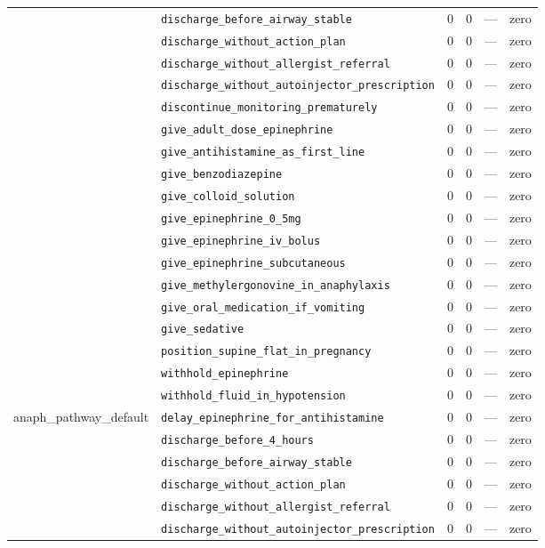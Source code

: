 \begin{table}[ht]
\begin{tabular}{llrrrl}
 & \texttt{discharge\_before\_airway\_stable} & 0 & 0 & — & zero \\
 & \texttt{discharge\_without\_action\_plan} & 0 & 0 & — & zero \\
 & \texttt{discharge\_without\_allergist\_referral} & 0 & 0 & — & zero \\
 & \texttt{discharge\_without\_autoinjector\_prescription} & 0 & 0 & — & zero \\
 & \texttt{discontinue\_monitoring\_prematurely} & 0 & 0 & — & zero \\
 & \texttt{give\_adult\_dose\_epinephrine} & 0 & 0 & — & zero \\
 & \texttt{give\_antihistamine\_as\_first\_line} & 0 & 0 & — & zero \\
 & \texttt{give\_benzodiazepine} & 0 & 0 & — & zero \\
 & \texttt{give\_colloid\_solution} & 0 & 0 & — & zero \\
 & \texttt{give\_epinephrine\_0\_5mg} & 0 & 0 & — & zero \\
 & \texttt{give\_epinephrine\_iv\_bolus} & 0 & 0 & — & zero \\
 & \texttt{give\_epinephrine\_subcutaneous} & 0 & 0 & — & zero \\
 & \texttt{give\_methylergonovine\_in\_anaphylaxis} & 0 & 0 & — & zero \\
 & \texttt{give\_oral\_medication\_if\_vomiting} & 0 & 0 & — & zero \\
 & \texttt{give\_sedative} & 0 & 0 & — & zero \\
 & \texttt{position\_supine\_flat\_in\_pregnancy} & 0 & 0 & — & zero \\
 & \texttt{withhold\_epinephrine} & 0 & 0 & — & zero \\
 & \texttt{withhold\_fluid\_in\_hypotension} & 0 & 0 & — & zero \\
\midrule
anaph\_pathway\_default & \texttt{delay\_epinephrine\_for\_antihistamine} & 0 & 0 & — & zero \\
 & \texttt{discharge\_before\_4\_hours} & 0 & 0 & — & zero \\
 & \texttt{discharge\_before\_airway\_stable} & 0 & 0 & — & zero \\
 & \texttt{discharge\_without\_action\_plan} & 0 & 0 & — & zero \\
 & \texttt{discharge\_without\_allergist\_referral} & 0 & 0 & — & zero \\
 & \texttt{discharge\_without\_autoinjector\_prescription} & 0 & 0 & — & zero \\

\end{tabular}
\end{table}
